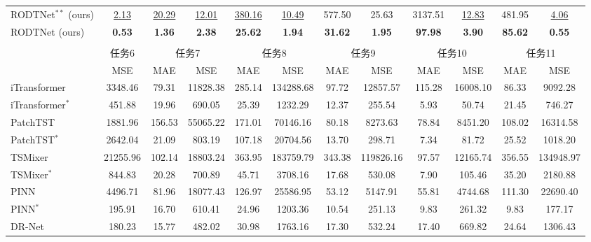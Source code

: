 \documentclass[UTF8,lettersize,journal]{IEEEtran}
\begin{document}
\begin{table}[htbp]
{\begin{adjustbox}{center}
{\begin{threeparttable}
\begin{tabular}{lccccccccccc}
        RODTNet$^{\ast\ast}$\tnote{b} {(ours)} & \underline{2.13}  & \underline{20.29}  & \underline{12.01}  & \underline{380.16}  & \underline{10.49}  & 577.50  & 25.63  & 3137.51  & \underline{12.83}  & 481.95  & \underline{4.06}  \\
        RODTNet (ours) & \textbf{0.53} & \textbf{1.36} & \textbf{2.38} & \textbf{25.62} & \textbf{1.94} & \textbf{31.62} & \textbf{1.95} & \textbf{97.98} & \textbf{3.90} & \textbf{85.62} & \textbf{0.55} \\
    \midrule
        \multicolumn{12}{c}{} \\
    \midrule
            & 任务6 & \multicolumn{2}{c}{任务7} & \multicolumn{2}{c}{任务8} & \multicolumn{2}{c}{任务9} & \multicolumn{2}{c}{任务10} & \multicolumn{2}{c}{任务11} \\
    \cmidrule{2-12}          & MSE   & MAE   & MSE   & MAE   & MSE   & MAE   & MSE   & MAE   & MSE   & MAE   & MSE \\
        \midrule
        iTransformer \cite{liu2024itransformer} & 3348.46  & 79.31  & 11828.38  & 285.14  & 134288.68  & 97.72  & 12857.57  & 115.28  & 16008.10  & 86.33  & 9092.28  \\
        iTransformer$^\ast$ \cite{liu2024itransformer} & 451.88  & 19.96  & 690.05  & 25.39  & 1232.29  & 12.37  & 255.54  & 5.93  & 50.74  & 21.45  & 746.27  \\
        PatchTST \cite{nie2023a} & 1881.96  & 156.53  & 55065.22  & 171.01  & 70146.16  & 80.18  & 8273.63  & 78.84  & 8451.20  & 108.02  & 16314.58  \\
        PatchTST$^\ast$ \cite{nie2023a} & 2642.04  & 21.09  & 803.19  & 107.18  & 20704.56  & 13.70  & 298.71  & 7.34  & 81.72  & 25.52  & 1018.20  \\
        TSMixer \cite{chen2023tsmixer} & 21255.96  & 102.14  & 18803.24  & 363.95  & 183759.79  & 343.38  & 119826.16  & 97.57  & 12165.74  & 356.55  & 134948.97  \\
        TSMixer$^\ast$ \cite{chen2023tsmixer} & 844.83  & 20.28  & 700.89  & 45.71  & 3708.16  & 17.68  & 530.08  & 7.90  & 105.46  & 35.20  & 2180.88  \\
        PINN \cite{wang2024physics}  & 4496.71  & 81.96  & 18077.43  & 126.97  & 25586.95  & 53.12  & 5147.91  & 55.81  & 4744.68  & 111.30  & 22690.40  \\
        PINN$^\ast$ \cite{wang2024physics} & 195.91  & 16.70  & 610.41  & 24.96  & 1203.36  & 10.54  & 251.13  & 9.83  & 261.32  & 9.83  & 177.17  \\
        DR-Net \cite{WANG2023108897} & 180.23  & 15.77  & 482.02  & 30.98  & 1763.16  & 17.30  & 532.24  & 17.40  & 669.82  & 24.64  & 1306.43  \\

\end{tabular}
\end{threeparttable}}
\end{adjustbox}}
\end{table}
\end{document}
